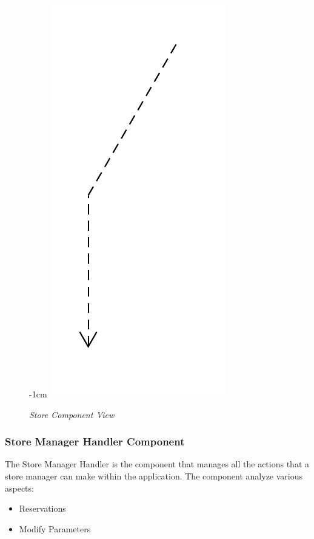 \documentclass{article}
\begin{document}
			\begin{figure}[H]
				\begin{adjustwidth} {-1cm}{}
					\centering
					\includegraphics[scale=0.22, angle=90, trim= 0 0 0 -5cm]{Component Diagrams/ReorderedStoreComponentView.pdf}\\
				\end{adjustwidth}
				\caption{\emph{Store Component View}}
			\end{figure}
			\newpage
			
		\subsubsection{Store Manager Handler Component}
			The Store Manager Handler is the component that manages all the actions that a store manager can make within the application. The component analyze various aspects:
			
			\begin{itemize}
				\item Reservations
				\item Modify Parameters
			\end{itemize}
		
\end{document}
